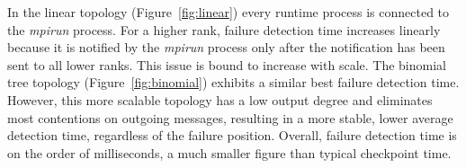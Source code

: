 In the linear topology (Figure~\ref{fig:linear}) every runtime process
is connected to the \emph{mpirun} process. For a higher rank, failure
detection time increases linearly because it is notified by the
\emph{mpirun} process only after the notification has been sent to all
lower ranks. This issue is bound to increase with scale. The binomial
tree topology (Figure~\ref{fig:binomial}) exhibits a similar best
failure detection time. However, this more scalable topology has a low
output degree and eliminates most contentions on outgoing messages,
resulting in a more stable, lower average detection time, regardless of the
failure position. Overall, failure detection time is on the order of
milliseconds, a much smaller figure than typical checkpoint time.




